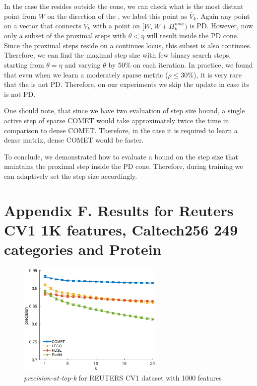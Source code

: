 \documentclass[twoside,11pt]{article}
\newcommand\mat[1]{{#1}}
\newcommand{\W}{\mat{W}}
\newcommand{\Hk}{H_k}
\newcommand{\Vk}{\mat{V_k}}
\begin{document}
In the case the \Vkorigin resides outside the cone, we can check what is the most distant point from $\W$ on the direction of the \Vkorigin, we label this point as $\widetilde{\Vk}$. Again any point on a vector that connects $\widetilde{\Vk}$ with a point on $[\W, \W + \Hk^{max})$ is PD. However, now only a subset of the proximal steps with $\theta < \eta$ will result inside the PD cone. Since the proximal steps reside on a continues locus, this subset is also continues. Therefore, we can find the maximal step size with few binary search steps, starting from $\theta = \eta$ and varying $\theta$ by 50\% on each iteration. In practice, we found that even when we learn a moderately sparse metric ($\rho \leq 30\%$), it is very rare that the \Vkorigin is not PD. Therefore, on our experiments we skip the update in case its \Vkorigin is not PD.

One should note, that since we have two evaluation of step size bound, a single active step of sparse COMET would take approximately twice the time in comparison to dense COMET. Therefore, in the case it is required to learn a dense matrix, dense COMET would be faster.

To conclude, we demonstrated how to evaluate a bound on the step size that maintains the proximal step inside the PD cone. Therefore, during training we can adaptively set the step size accordingly.

\section*{Appendix F. Results for Reuters CV1 1K features, Caltech256 249 categories and Protein}

\begin{figure}[h]
\centering
\includegraphics[width=7cm]{precision@k_rcv1_4_ig1000}
\captionsetup{font=small}
\caption*{\textit{precision-at-top-k} for REUTERS CV1 dataset with 1000 features}

\end{figure}
\end{document}
